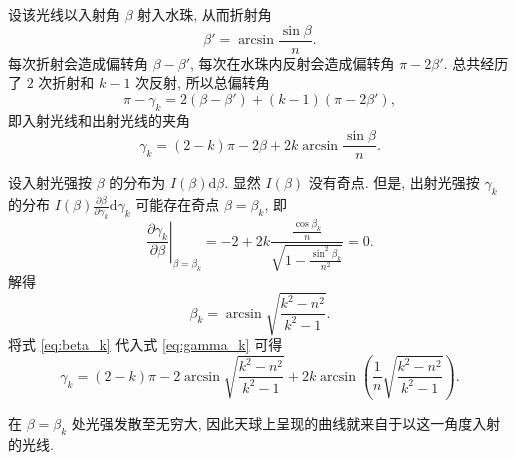 \documentclass{article}
\begin{document}
设该光线以入射角 $\beta$ 射入水珠, 从而折射角
\begin{equation}
	\beta'=\arcsin\frac{\sin\beta}n.
\end{equation}
每次折射会造成偏转角 $\beta-\beta'$, 每次在水珠内反射会造成偏转角 $\pi-2\beta'$.
总共经历了 $2$ 次折射和 $k-1$ 次反射, 所以总偏转角
\begin{equation}
	\pi-\gamma_k=2\left(\beta-\beta'\right)+\left(k-1\right)\left(\pi-2\beta'\right),
\end{equation}
即入射光线和出射光线的夹角
\begin{equation}
	\gamma_k=\left(2-k\right)\pi-2\beta+2k\arcsin\frac{\sin\beta}n.
	\label{eq:gamma_k}
\end{equation}

设入射光强按 $\beta$ 的分布为 $I\left(\beta\right)\mathrm d\beta$.
显然 $I\left(\beta\right)$ 没有奇点.
但是, 出射光强按 $\gamma_k$ 的分布 $I\left(\beta\right)\frac{\partial\beta}{\partial\gamma_k}\mathrm d\gamma_k$ 可能存在奇点 $\beta=\beta_k$,
即
\begin{equation}
	\left.\frac{\partial\gamma_k}{\partial\beta}\right|_{\beta=\beta_k}=-2+2k\frac{\frac{\cos\beta_k}n}{\sqrt{1-\frac{\sin^2\beta_k}{n^2}}}=0.
\end{equation}
解得
\begin{equation}
	\label{eq:beta_k}
	\beta_k=\arcsin\sqrt{\frac{k^2-n^2}{k^2-1}}.
\end{equation}
将式 \ref{eq:beta_k} 代入式 \ref{eq:gamma_k} 可得
\begin{equation}
	\gamma_k=\left(2-k\right)\pi-2\arcsin\sqrt{\frac{k^2-n^2}{k^2-1}}+2k\arcsin\left(\frac1n\sqrt{\frac{k^2-n^2}{k^2-1}}\right).
	\label{eq:完整的gamma_k}
\end{equation}

在 $\beta=\beta_k$ 处光强发散至无穷大, 因此天球上呈现的曲线就来自于以这一角度入射的光线.

\begin{figure}[h!]
	\centering
	\caption{}
	\label{fig:总光路图}
\end{figure}
\end{document}
